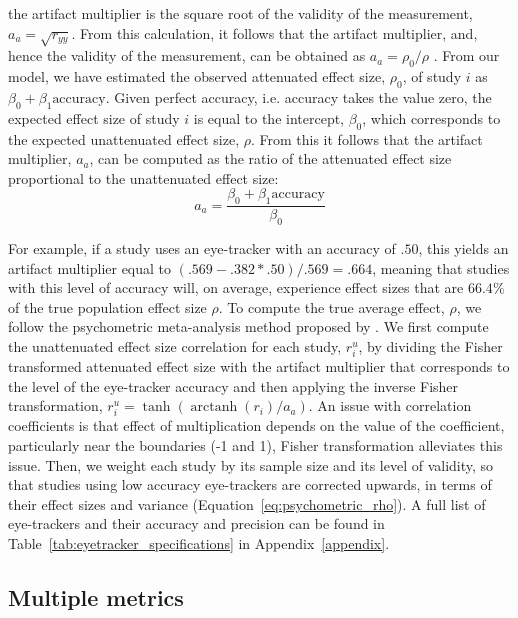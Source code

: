 \documentclass[english,natbib,man,floatsintext]{apa6}
\DeclareMathOperator\arctanh{arctanh}
\begin{document}
the artifact multiplier is the square root of the validity of the measurement, $a_a = \sqrt{r_{yy}}$. From this calculation, it follows that the artifact multiplier, and, hence the validity of the measurement, can be obtained as $a_a = \rho_0 / \rho$ \citep{hunter2004a}. From our model, we have estimated the observed attenuated effect size, $\rho_0$, of study $i$ as $\beta_0 + \beta_1 \textrm{accuracy}$. Given perfect accuracy, i.e. accuracy takes the value zero, the expected effect size of study $i$ is equal to the intercept, $\beta_0$, which corresponds to the expected unattenuated effect size, $\rho$. From this it follows that the artifact multiplier, $a_a$, can be computed as the ratio of the attenuated effect size proportional to the unattenuated effect size:
%
\begin{equation}
\label{eq:artifact_multiplier}
a_a = \frac{\beta_0 + \beta_1 \textrm{accuracy}}{\beta_0}
\end{equation}

For example, if a study uses an eye-tracker with an accuracy of $.50$, this yields an artifact multiplier equal to $(.569 - .382*.50)/.569 = .664$, meaning that studies with this level of accuracy will, on average, experience effect sizes that are $66.4\%$ of the true population effect size $\rho$. To compute the true average effect, $\rho$, we follow the psychometric meta-analysis method proposed by \cite{hunter2004a}. We first compute the unattenuated effect size correlation for each study, $r_i^u$, by dividing the Fisher transformed attenuated effect size with the artifact multiplier that corresponds to the level of the eye-tracker accuracy and then applying the inverse Fisher transformation, $r_i^u = \tanh(\arctanh(r_i)/a_a)$. An issue with correlation coefficients is that effect of multiplication depends on the value of the coefficient, particularly near the boundaries (-1 and 1), Fisher transformation alleviates this issue. Then, we weight each study by its sample size and its level of validity, so that studies using low accuracy eye-trackers are corrected upwards, in terms of their effect sizes and variance (Equation~\ref{eq:psychometric_rho}). A full list of eye-trackers and their accuracy and precision can be found in Table~\ref{tab:eyetracker_specifications} in Appendix~\ref{appendix}.


\subsection{Multiple metrics}
\end{document}
